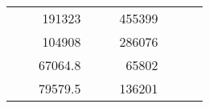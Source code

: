 \begin{table}[H]
\begin{tabular}{|ccrccrccc}
\multicolumn{1}{|c|}{\cellcolor[HTML]{FFFFC7}}                                & \multicolumn{1}{c|}{\cellcolor[HTML]{DDFDFF}}                      & \multicolumn{1}{r|}{\cellcolor[HTML]{DAE8FC}191323}    & \multicolumn{1}{c|}{\cellcolor[HTML]{FFFFC7}}                                & \multicolumn{1}{c|}{\cellcolor[HTML]{DDFDFF}}                       & \multicolumn{1}{r|}{\cellcolor[HTML]{DDFDFF}455399}    &                                                                              &                                                                    &                                                        \\ \cline{3-3} \cline{6-6}
\multicolumn{1}{|c|}{\cellcolor[HTML]{FFFFC7}}                                & \multicolumn{1}{c|}{\cellcolor[HTML]{DDFDFF}}                      & \multicolumn{1}{r|}{\cellcolor[HTML]{DDFDFF}104908}    & \multicolumn{1}{c|}{\cellcolor[HTML]{FFFFC7}}                                & \multicolumn{1}{c|}{\cellcolor[HTML]{DDFDFF}}                       & \multicolumn{1}{r|}{\cellcolor[HTML]{DAE8FC}286076}    &                                                                              &                                                                    &                                                        \\ \cline{3-3} \cline{6-6}
\multicolumn{1}{|c|}{\cellcolor[HTML]{FFFFC7}}                                & \multicolumn{1}{c|}{\cellcolor[HTML]{DDFDFF}}                      & \multicolumn{1}{r|}{\cellcolor[HTML]{DAE8FC}67064.8}   & \multicolumn{1}{c|}{\cellcolor[HTML]{FFFFC7}}                                & \multicolumn{1}{c|}{\cellcolor[HTML]{DDFDFF}}                       & \multicolumn{1}{r|}{\cellcolor[HTML]{DDFDFF}65802}     &                                                                              &                                                                    &                                                        \\ \cline{3-3} \cline{6-6}
\multicolumn{1}{|c|}{\cellcolor[HTML]{FFFFC7}}                                & \multicolumn{1}{c|}{\cellcolor[HTML]{DDFDFF}}                      & \multicolumn{1}{r|}{\cellcolor[HTML]{DDFDFF}79579.5}   & \multicolumn{1}{c|}{\cellcolor[HTML]{FFFFC7}}                                & \multicolumn{1}{c|}{\cellcolor[HTML]{DDFDFF}}                       & \multicolumn{1}{r|}{\cellcolor[HTML]{DAE8FC}136201}    &                                                                              &                                                                    &                                                        \\ \cline{3-3} \cline{6-6}

\end{tabular}
\end{table}
